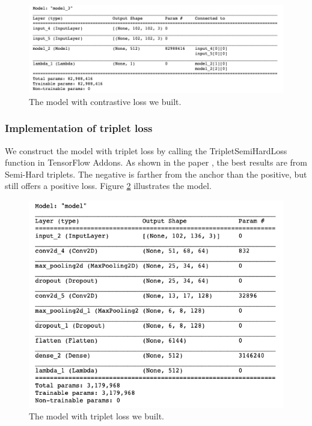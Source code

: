 \begin{figure}[h]
  \centering
  \includegraphics[width=\linewidth]{figs/contra_model.png}
  \caption{The model with contrastive loss we built.}
  \label{fig:contra_model}
\end{figure}

\subsubsection{Implementation of triplet loss}
We construct the model with triplet loss by calling the TripletSemiHardLoss function in TensorFlow Addons. As shown in the paper \cite{}, the best results are from Semi-Hard triplets. The negative is farther from the anchor than the positive, but still offers a positive loss. Figure \ref{fig:tri_model} illustrates the model. 

\begin{figure}[h]
  \centering
  \includegraphics[width=\linewidth]{figs/tri_model.png}
  \caption{The model with triplet loss we built.}
  \label{fig:tri_model}
\end{figure}

